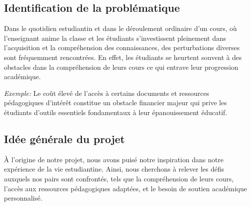 \subsection{Identification de la problématique}
Dans le quotidien estudiantin et dans le déroulement ordinaire d'un cours, où l'enseignant anime la classe et les étudiants s'investissent pleinement dans l'acquisition et la compréhension des connaissances, des perturbations diverses sont fréquemment rencontrées. En effet, les étudiants se heurtent souvent à des obstacles dans la compréhension de leurs cours ce qui entrave leur progression académique.

\vspace{0.5em}

\vspace{0.5em}
\noindent \textit{Exemple:} Le coût élevé de l’accès à certains documents et ressources pédagogiques d’intérêt constitue un obstacle financier majeur qui prive les étudiants d’outils essentiels fondamentaux à leur épanouissement éducatif.

\subsection{Idée générale du projet}
À l'origine de notre projet, nous avons puisé notre inspiration dans notre expérience de la vie estudiantine. Ainsi, nous cherchons à relever les défis auxquels nos pairs sont confrontés, tels que la compréhension de leurs cours, l’accès aux ressources pédagogiques adaptées, et le besoin de soutien académique personnalisé.

\vspace{0.5em}

